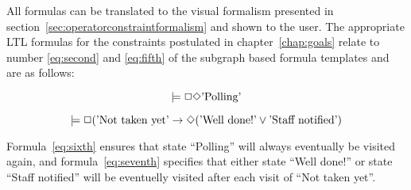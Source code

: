 All formulas can be translated to the visual formalism presented in section~\ref{sec:operatorconstraintformalism} and shown to the user. The appropriate LTL formulas for the constraints postulated in chapter~\ref{chap:goals} relate to number \ref{eq:second} and \ref{eq:fifth} of the subgraph based formula templates and are as follows:

\begin{equation} \label{eq:sixth}
  \models \Box \Diamond \textnormal{'Polling'}
\end{equation}

\begin{equation} \label{eq:seventh}
	\models \Box (\textnormal{'Not taken yet'} \rightarrow \Diamond (\textnormal{'Well done!'} \vee \textnormal{'Staff notified'})
\end{equation}

Formula~\ref{eq:sixth} ensures that state ``Polling'' will always eventually be visited again, and formula~\ref{eq:seventh} specifies that either state ``Well done!'' or state ``Staff notified'' will be eventuelly visited after each visit of ``Not taken yet''.